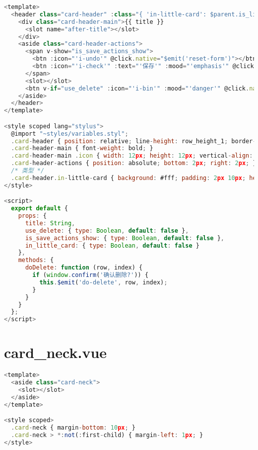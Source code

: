 \begin{lstlisting}[language=JavaScript]
<template>
  <header class="card-header" :class="{ 'in-little-card': $parent.is_little }">
    <div class="card-header-main">{{ title }}
      <slot name="after-title"></slot>
    </div>
    <aside class="card-header-actions">
      <span v-show="is_save_actions_show">
        <btn :icon="'i-undo'" @click.native="$emit('reset-form')"></btn>
        <btn :icon="'i-check'" :text="'保存'" :mood="'emphasis'" @click.native="$emit('save-form')"></btn>
      </span>
      <slot></slot>
      <btn v-if="use_delete" :icon="'i-bin'" :mood="'danger'" @click.native="doDelete"></btn>
    </aside>
  </header>
</template>

<style scoped lang="stylus">
  @import "~styles/variables.styl";
  .card-header { position: relative; line-height: row_height_1; border-bottom: 1px solid light_gray_1; margin-bottom: 10px; }
  .card-header-main { font-weight: bold; }
  .card-header-main .icon { width: 12px; height: 12px; vertical-align: -2px; margin-left: 5px; }
  .card-header-actions { position: absolute; bottom: 2px; right: 2px; }
  /* 类型 */
  .card-header.in-little-card { background: #fff; padding: 2px 10px; height: 26px; margin-bottom: 0; border: none; }
</style>

<script>
  export default {
    props: {
      title: String,
      use_delete: { type: Boolean, default: false },
      is_save_actions_show: { type: Boolean, default: false },
      in_little_card: { type: Boolean, default: false }
    },
    methods: {
      doDelete: function (row, index) {
        if (window.confirm('确认删除?')) {
          this.$emit('do-delete', row, index);
        }
      }
    }
  };
</script>
\end{lstlisting}


\subsection{}


\section{card\_neck.vue}


\begin{lstlisting}[language=JavaScript]
<template>
  <aside class="card-neck">
    <slot></slot>
  </aside>
</template>

<style scoped>
  .card-neck { margin-bottom: 10px; }
  .card-neck > *:not(:first-child) { margin-left: 1px; }
</style>
\end{lstlisting}


